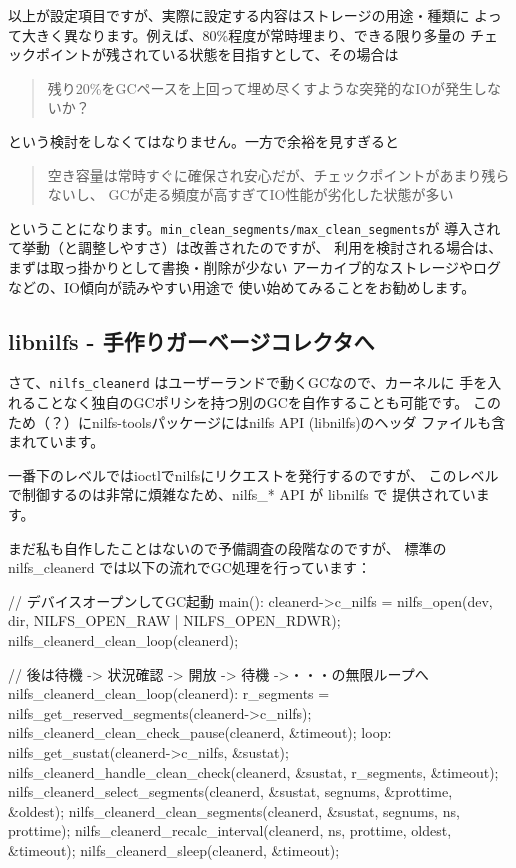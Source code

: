 \documentclass[mingoth,a4paper]{jsarticle}
\begin{document}
以上が設定項目ですが、実際に設定する内容はストレージの用途・種類に
よって大きく異なります。例えば、80\%程度が常時埋まり、できる限り多量の
チェックポイントが残されている状態を目指すとして、その場合は
\begin{quote}
残り20\%をGCペースを上回って埋め尽くすような突発的なIOが発生しないか？
\end{quote}
という検討をしなくてはなりません。一方で余裕を見すぎると
\begin{quote}
空き容量は常時すぐに確保され安心だが、チェックポイントがあまり残らないし、
GCが走る頻度が高すぎてIO性能が劣化した状態が多い
\end{quote}
ということになります。\verb|min_clean_segments/max_clean_segments|が
導入されて挙動（と調整しやすさ）は改善された\cite{nilgcnew}のですが、
利用を検討される場合は、まずは取っ掛かりとして書換・削除が少ない
アーカイブ的なストレージやログなどの、IO傾向が読みやすい用途で
使い始めてみることをお勧めします。

\subsection{libnilfs - 手作りガーベージコレクタへ}

さて、\verb|nilfs_cleanerd| はユーザーランドで動くGCなので、カーネルに
手を入れることなく独自のGCポリシを持つ別のGCを自作することも可能です。
このため（？）にnilfs-toolsパッケージにはnilfs API (libnilfs)のヘッダ
ファイルも含まれています。

一番下のレベルではioctlでnilfsにリクエストを発行するのですが、
このレベルで制御するのは非常に煩雑なため、nilfs\_* API が libnilfs で
提供されています。

まだ私も自作したことはないので予備調査の段階なのですが、
標準の nilfs\_cleanerd では以下の流れでGC処理を行っています：

\begin{commandline}
// デバイスオープンしてGC起動
main():
    cleanerd->c_nilfs = nilfs_open(dev, dir, NILFS_OPEN_RAW | NILFS_OPEN_RDWR);
    nilfs_cleanerd_clean_loop(cleanerd);

// 後は待機 -> 状況確認 -> 開放 -> 待機 ->・・・の無限ループへ
nilfs_cleanerd_clean_loop(cleanerd):
    r_segments = nilfs_get_reserved_segments(cleanerd->c_nilfs);
    nilfs_cleanerd_clean_check_pause(cleanerd, &timeout);
    loop:
        nilfs_get_sustat(cleanerd->c_nilfs, &sustat);
        nilfs_cleanerd_handle_clean_check(cleanerd, &sustat, r_segments, &timeout);
        nilfs_cleanerd_select_segments(cleanerd, &sustat, segnums, &prottime, &oldest);
        nilfs_cleanerd_clean_segments(cleanerd, &sustat, segnums, ns, prottime);
        nilfs_cleanerd_recalc_interval(cleanerd, ns, prottime, oldest, &timeout);
        nilfs_cleanerd_sleep(cleanerd, &timeout);
\end{commandline}
\end{document}
